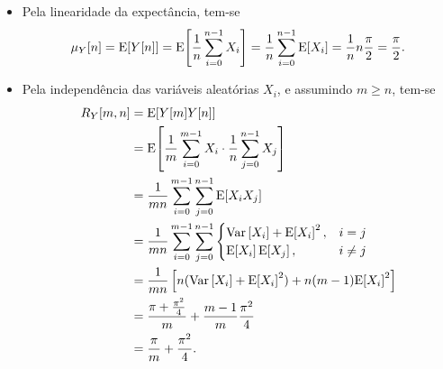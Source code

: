 \begin{respostas}
\begin{itemize}
    \item [a)] Pela linearidade da expectância, tem-se
    \begin{equation}
        \mu_Y[n] 
        = \mathrm{E}\!\left[Y[n]\right]
        = \mathrm{E}\!\left[\frac{1}{n} \sum_{i=0}^{n-1} X_i\right]
        = \frac{1}{n} \sum_{i=0}^{n-1} \mathrm{E}\!\left[X_i\right]
        = \frac{1}{n} n \frac{\pi}{2} = \frac{\pi}{2}.
    \end{equation}

    \item [b)] Pela independência das variáveis aleatórias $X_i$, e assumindo $m \geq n$, tem-se
    \begin{align}
        R_Y[m,n] 
        &= \E{Y[m]Y[n]} \\
        &= \E{\frac{1}{m} \sum_{i=0}^{m-1} X_i \cdot \frac{1}{n} \sum_{j=0}^{n-1} X_j} \\
        &= \frac{1}{mn} \sum_{i=0}^{m-1} \sum_{j=0}^{n-1} \E{X_i X_j} \\
        &= \frac{1}{mn} \sum_{i=0}^{m-1} \sum_{j=0}^{n-1} 
            \begin{cases}
                \Var{X_i} + \E{X_i}^2, & i = j \\
                \E{X_i}\E{X_j}, & i \neq j
            \end{cases} \\
        &= \frac{1}{mn} \left[
                n(\Var{X_i} + \E{X_i}^2) + n(m-1)\E{X_i}^2
            \right] \\
        &= \frac{\pi + \frac{\pi^2}{4}}{m} + \frac{m-1}{m}\frac{\pi^2}{4}\\
        &= \frac{\pi}{m} + \frac{\pi^2}{4}.
    \end{align}
    \begin{figure}[H]
        \centering
\end{figure}
\end{itemize}
\end{respostas}
